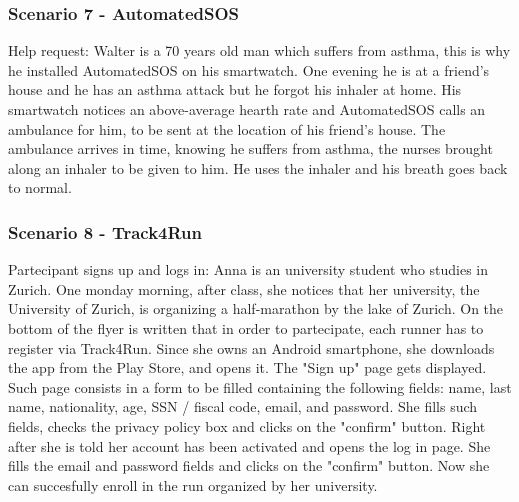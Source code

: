 {\color{secblue}\subsubsection{Scenario 7 - AutomatedSOS}}
Help request:
Walter is a 70 years old man which suffers from asthma, this is why he installed AutomatedSOS on his smartwatch.
One evening he is at a friend's house and he has an asthma attack but he forgot his inhaler at home.
His smartwatch notices an above-average hearth rate and AutomatedSOS calls an ambulance for him, to be sent at the location of his friend's house.
The ambulance arrives in time, knowing he suffers from asthma, the nurses brought along an inhaler to be given to him.
He uses the inhaler and his breath goes back to normal.

{\color{secblue}\subsubsection{Scenario 8 - Track4Run}}
Partecipant signs up and logs in:
Anna is an university student who studies in Zurich.
One monday morning, after class, she notices that her university, the University of Zurich, is organizing a half-marathon by the lake of Zurich.
On the bottom of the flyer is written that in order to partecipate, each runner has to register via Track4Run.
Since she owns an Android smartphone, she downloads the app from the Play Store, and opens it.
The "Sign up" page gets displayed. 
Such page consists in a form to be filled containing the following fields:
name, last name, nationality, age, SSN / fiscal code, email, and password. 
She fills such fields, checks the privacy policy box and clicks on the "confirm" button.
Right after she is told her account has been activated and opens the log in page.  
She fills the email and password fields and clicks on the "confirm" button.
Now she can succesfully enroll in the run organized by her university.


